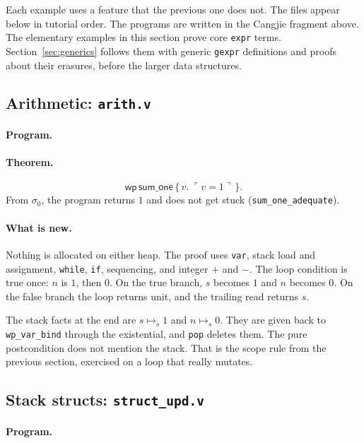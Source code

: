 \documentclass[11pt]{article}
\newcommand{\ptss}{\mathrel{\mapsto_{s}}}
\newcommand{\Wpre}{\mathsf{wp}}
\newcommand{\pure}[1]{\ulcorner #1 \urcorner}
\begin{document}
Each example uses a feature that the previous one does not.
The files appear below in tutorial order.
The programs are written in the Cangjie fragment above.
The elementary examples in this section prove core \texttt{expr} terms.
Section~\ref{sec:generics} follows them with generic \texttt{gexpr}
definitions and proofs about their erasures, before the larger data structures.

\subsection{Arithmetic: \texttt{arith.v}}

\paragraph{Program.}\mbox{}\par


\paragraph{Theorem.}
\[
\Wpre\,\mathsf{sum\_one}\,\{\,v.\; \pure{v=1}\,\}.
\]
From \(\sigma_0\), the program returns \(1\) and does not get stuck (\texttt{sum\_one\_adequate}).

\paragraph{What is new.}
Nothing is allocated on either heap.
The proof uses \texttt{var}, stack load and assignment, \texttt{while}, \texttt{if}, sequencing, and integer \(+\) and \(-\).
The loop condition is true once: \(n\) is \(1\), then \(0\).
On the true branch, \(s\) becomes \(1\) and \(n\) becomes \(0\).
On the false branch the loop returns unit, and the trailing read returns \(s\).

The stack facts at the end are \(s \ptss 1\) and \(n \ptss 0\).
They are given back to \texttt{wp\_var\_bind} through the existential, and \texttt{pop} deletes them.
The pure postcondition does not mention the stack.
That is the scope rule from the previous section, exercised on a loop that really mutates.

\subsection{Stack structs: \texttt{struct\_upd.v}}

\paragraph{Program.}\mbox{}\par

\end{document}
